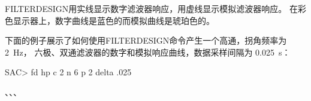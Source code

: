 FILTERDESIGN用实线显示数字滤波器响应，用虚线显示模拟滤波器响应。
在彩色显示器上，数字曲线是蓝色的而模拟曲线是琥珀色的。

下面的例子展示了如何使用FILTERDESIGN命令产生一个高通，拐角频率为 \SI{2}{\Hz}，
六极、双通滤波器的数字和模拟响应曲线，数据采样间隔为 \SI{0.025}{\s}：
\begin{SACCode}
SAC> fd hp c 2 n 6 p 2 delta .025
\end{SACCode}

、、、

